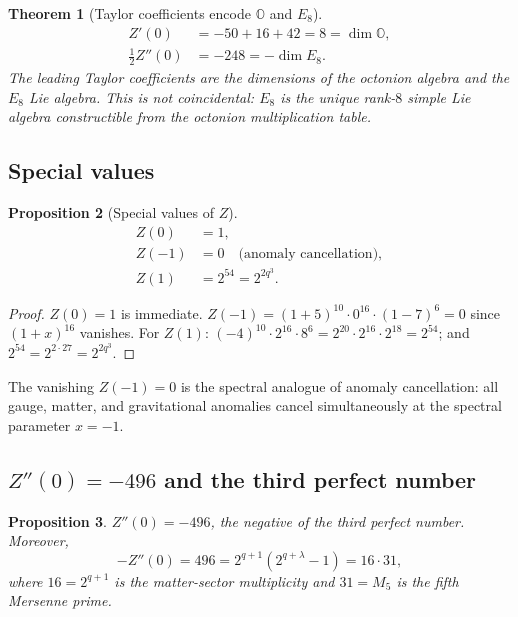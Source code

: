 \documentclass[12pt,a4paper]{article}
\newtheorem{theorem}{Theorem}[section]
\newtheorem{proposition}[theorem]{Proposition}
\theoremstyle{definition}
\newcommand{\OO}{\mathbb{O}}
\begin{document}
\begin{theorem}[Taylor coefficients encode $\OO$ and $E_8$]
\label{thm:taylor}
\begin{align}
  Z'(0)              &= -50+16+42 = 8 = \dim\OO, \\
  \tfrac{1}{2}Z''(0) &= -248 = -\dim E_8.
\end{align}
The leading Taylor coefficients are the dimensions of the octonion algebra
and the $E_8$ Lie algebra.  This is not coincidental: $E_8$ is the unique
rank-$8$ simple Lie algebra constructible from the octonion multiplication table.
\end{theorem}

\subsection{Special values}

\begin{proposition}[Special values of $Z$]
\label{prop:special}
\begin{align}
  Z(0)  &= 1, \label{eq:Z0}\\
  Z(-1) &= 0 \quad\text{(anomaly cancellation)}, \label{eq:Zm1}\\
  Z(1)  &= 2^{54} = 2^{2q^3}. \label{eq:Z1}
\end{align}
\end{proposition}

\begin{proof}
$Z(0)=1$ is immediate.
$Z(-1)=(1+5)^{10}\cdot 0^{16}\cdot(1-7)^6=0$ since $(1+x)^{16}$ vanishes.
For $Z(1)$: $(-4)^{10}\cdot 2^{16}\cdot 8^6 = 2^{20}\cdot 2^{16}\cdot 2^{18}=2^{54}$;
and $2^{54}=2^{2\cdot 27}=2^{2q^3}$.
\end{proof}

The vanishing $Z(-1)=0$ is the spectral analogue of anomaly cancellation:
all gauge, matter, and gravitational anomalies cancel simultaneously at the
spectral parameter $x=-1$.

\subsection{\texorpdfstring{$Z''(0)=-496$}{Z''(0)=-496} and the third perfect number}

\begin{proposition}
\label{prop:perfect}
$Z''(0) = -496$, the negative of the third perfect number.  Moreover,
\begin{equation}
  -Z''(0) = 496 = 2^{q+1}(2^{q+\lambda}-1) = 16\cdot 31,
\end{equation}
where $16=2^{q+1}$ is the matter-sector multiplicity and $31=M_5$ is the
fifth Mersenne prime.
\end{proposition}
\end{document}
